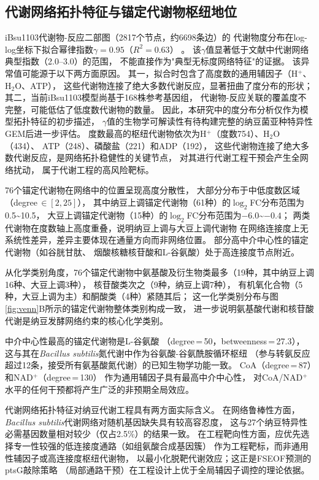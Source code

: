 \documentclass[10pt, a4paper, twocolumn]{ctexart}
\newcommand{\ibsu}{iBsu1103}
\newcommand{\bs}{\textit{Bacillus subtilis}}
\begin{document}
\subsection{代谢网络拓扑特征与锚定代谢物枢纽地位}

\ibsu{}代谢物-反应二部图（2817个节点，约6698条边）的
代谢物度分布在log-log坐标下拟合幂律指数$\gamma=0.95$（$R^2=0.63$）
\citep{Jeong2000,Newman2003}。
该$\gamma$值显著低于文献中代谢网络典型指数（2.0--3.0）的范围，
不能直接作为"典型无标度网络特征"的证据。
该异常值可能源于以下两方面原因。
其一，拟合时包含了高度数的通用辅因子（H$^+$、H$_2$O、ATP），
这些代谢物连接了绝大多数代谢反应，显著扭曲了度分布的形状；
其二，当前\ibsu{}模型尚基于168株参考基因组，
代谢物-反应关联的覆盖度不完整，可能低估了低度数代谢物的数量。
因此，本研究中的度分布分析仅作为模型拓扑特征的初步描述，
$\gamma$值的生物学可解读性有待构建完整的纳豆菌亚种特异性GEM后进一步评估。
度数最高的枢纽代谢物依次为H$^+$（度数754）、H$_2$O（434）、
ATP（248）、磷酸盐（221）和ADP（192），
这些代谢物连接了绝大多数代谢反应，是网络拓扑稳健性的关键节点，
对其进行代谢工程干预会产生全网络扰动，
属于代谢工程的高风险靶标。

76个锚定代谢物在网络中的位置呈现高度分散性，
大部分分布于中低度数区域（degree\,$\in[2,25]$），
其中纳豆上调锚定代谢物（61种）的$\log_2$FC分布范围为0.5\textasciitilde10.5，
大豆上调锚定代谢物（15种）的$\log_2$FC分布范围为$-6.0$\textasciitilde$-0.4$；
两类代谢物在度数轴上高度重叠，说明纳豆上调与大豆上调代谢物
在网络连接度上无系统性差异，差异主要体现在通量方向而非网络位置。
部分高中介中心性的锚定代谢物（如谷胱甘肽、
烟酸核糖核苷酸和L-谷氨酸）处于高连接度节点附近。

从化学类别角度，76个锚定代谢物中氨基酸及衍生物类最多（19种，其中纳豆上调16种、大豆上调3种），
核苷酸类次之（9种，纳豆上调7种），
有机氧化合物（5种，大豆上调为主）和酮酸类（4种）紧随其后；
这一化学类别分布与图\ref{fig:venn}B所示的锚定代谢物整体类别构成一致，
进一步说明氨基酸代谢和核苷酸代谢是纳豆发酵网络约束的核心化学类别。

中介中心性最高的锚定代谢物是L-谷氨酸
（degree\,=\,50，betweenness\,=\,27.3），
这与其在\bs{}氮代谢中作为谷氨酸-谷氨酰胺循环枢纽
（参与转氨反应超过12条，接受所有氨基酸氮代谢）的已知生物学功能一致。
CoA（degree\,=\,87）和NAD$^+$（degree\,=\,130）
作为通用辅因子具有最高中介中心性，
对CoA/NAD$^+$水平的任何干预都将产生广泛的非预期全局效应。

代谢网络拓扑特征对纳豆代谢工程具有两方面实际含义。
在网络鲁棒性方面，\bs{}代谢网络对随机基因缺失具有较高容忍度，
这与27个纳豆特异性必需基因数量相对较少（仅占2.5\%）的结果一致。
在工程靶向性方面，应优先选择专一性较强的低连接度通路（如组氨酸合成基因簇）
作为工程靶标，而非通用性辅因子或高连接度枢纽代谢物，
以最小化脱靶代谢效应；这正是FSEOF预测的ptsG敲除策略
（局部通路干预）在工程设计上优于全局辅因子调控的理论依据。
\end{document}
